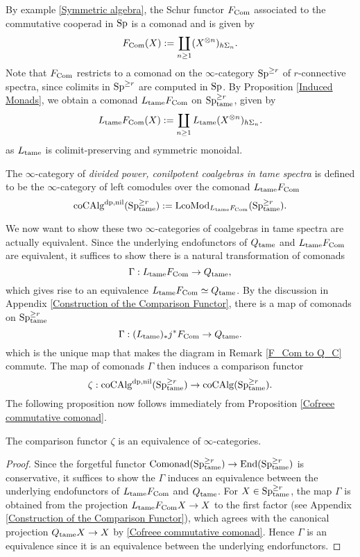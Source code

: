 By example \ref{Symmetric algebra}, the Schur functor $F_{\operatorname{Com}}$ associated to the commutative cooperad in $\operatorname{Sp}$ is a comonad and is given by
$$
F_{\operatorname{Com}}(X) := \coprod_{n\geq 1} (X^{\otimes n})_{h\Sigma_n}.
$$
Note that $F_{\operatorname{Com}}$ restricts to a comonad on the $\infty$-category $\operatorname{Sp}^{\geq r}$ of $r$-connective spectra, since colimits in $\operatorname{Sp}^{\geq r}$ are computed in $\operatorname{Sp}$.
By Proposition \ref{Induced Monads}, we obtain a comonad $L_{\operatorname{\operatorname{tame}}}F_{\operatorname{Com}}$ on $\operatorname{Sp}_{\operatorname{\operatorname{tame}}}^{\geq r}$, given by 
$$
L_{\operatorname{\operatorname{tame}}} F_{\operatorname{Com}}(X) := \coprod_{n\geq 1} L_{\operatorname{\operatorname{tame}}}(X^{\otimes n})_{h\Sigma_n}.
$$
as $L_{\operatorname{\operatorname{tame}}}$ is colimit-preserving and symmetric monoidal.


\begin{definition}
\label{Def of tame dp, nil coalgebras}
    The $\infty$-category of \emph{divided power, conilpotent coalgebras in tame spectra} is defined to be the $\infty$-category of left comodules over the comonad $L_{\operatorname{\operatorname{tame}}}F_{\operatorname{Com}}$
    \[
    \operatorname{coCAlg}^{\operatorname{dp}, \operatorname{nil}}(\operatorname{Sp}_{\operatorname{\operatorname{tame}}}^{\geq r}):= \operatorname{LcoMod}_{L_{\operatorname{\operatorname{tame}}}F_{\operatorname{Com}}}(\operatorname{Sp}_{\operatorname{\operatorname{tame}}}^{\geq r}).
    \]
\end{definition}
We now want to show these two $\infty$-categories of coalgebras in tame spectra are actually equivalent. 
Since the underlying endofunctors of $Q_{\operatorname{\operatorname{tame}}}$ and $L_{\operatorname{\operatorname{tame}}}F_{\operatorname{Com}}$ are equivalent, it suffices to show there is a natural transformation of comonads
$$
\Gamma: L_{\operatorname{\operatorname{tame}}}F_{\operatorname{Com}}\to 
Q_{\operatorname{\operatorname{tame}}},
$$
which gives rise to an equivalence $L_{\operatorname{\operatorname{tame}}}F_{\operatorname{Com}}\simeq Q_{\operatorname{\operatorname{tame}}}$.
By the discussion in Appendix \ref{Construction of the Comparison Functor}, there is a map of comonads on $\operatorname{Sp}^{\geq r}_{\operatorname{\operatorname{tame}}}$
$$
\Gamma: (L_{\operatorname{\operatorname{tame}}})_{*} j^{*} F_{\operatorname{Com}} \to Q_{\operatorname{\operatorname{tame}}}.
$$
which is the unique map that makes the diagram in Remark \ref{F_Com to Q_C} commute.
The map of comonads $\Gamma$ then induces a comparison functor 
$$
\zeta:\operatorname{coCAlg}^{\operatorname{dp},\operatorname{nil}}(\operatorname{Sp}^{\geq r}_{\operatorname{\operatorname{tame}}}) \to
\operatorname{coCAlg}(\operatorname{Sp}^{\geq r}_{\operatorname{\operatorname{tame}}}).
$$
The following proposition now follows immediately from Proposition \ref{Cofreee commutative comonad}.
\begin{proposition}
\label{all coalgebras are equivalent}
	The comparison functor $\zeta$ is an equivalence of $\infty$-categories.
\end{proposition}
\begin{proof}
Since the forgetful functor $\operatorname{Comonad}(\operatorname{Sp}^{\geq r}_{\operatorname{\operatorname{tame}}}) \to \operatorname{End}(\operatorname{Sp}^{\geq r}_{\operatorname{\operatorname{tame}}})$ is conservative,
it suffices to show the $\Gamma$ induces an equivalence between the underlying endofunctors of $L_{\operatorname{\operatorname{tame}}}F_{\operatorname{Com}}$ and $Q_{\operatorname{\operatorname{tame}}}$. For $X\in \operatorname{Sp}^{\geq r}_{\operatorname{\operatorname{tame}}}$, the map $\Gamma$ is obtained from the projection $L_{\operatorname{\operatorname{tame}}}F_{\operatorname{Com}}X \to X$ to the first factor (see Appendix \ref{Construction of the Comparison Functor}), which agrees with the canonical projection $Q_{\operatorname{\operatorname{tame}}}X\to X$ by \ref{Cofreee commutative comonad}. Hence $\Gamma$ is an equivalence since it is an equivalence between the underlying endorfunctors.

\end{proof}





